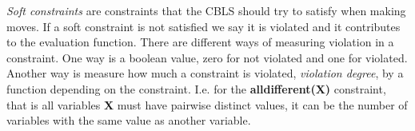 \emph{Soft constraints} are constraints that the CBLS should try to satisfy when making moves. If a 
soft constraint is not satisfied we say it is violated and it contributes to the evaluation function. There are 
different ways of measuring violation in a constraint. One way is a boolean value, zero for not violated and one for 
violated. Another way is measure how much a constraint is violated, \emph{violation degree}, by a function depending on 
the constraint. I.e. for the \textbf{alldifferent(X)} constraint, that is all variables \textbf{X} must have pairwise 
distinct values, it can be the number of variables with the same value as another variable. \\ 

